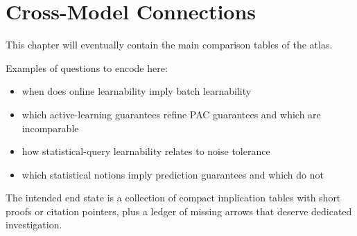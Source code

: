 \chapter{Cross-Model Connections}

This chapter will eventually contain the main comparison tables of the atlas.

Examples of questions to encode here:

\begin{itemize}
\item when does online learnability imply batch learnability
\item which active-learning guarantees refine PAC guarantees and which are incomparable
\item how statistical-query learnability relates to noise tolerance
\item which statistical notions imply prediction guarantees and which do not
\end{itemize}

The intended end state is a collection of compact implication tables with short proofs or citation pointers, plus a ledger of missing arrows that deserve dedicated investigation.
